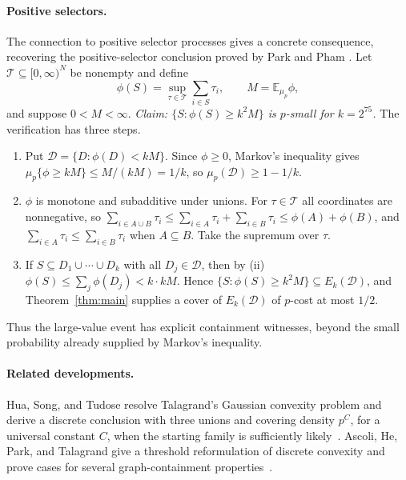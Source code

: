 \documentclass[11pt,letterpaper]{article}
\theoremstyle{definition}
\theoremstyle{remark}
\numberwithin{equation}{section}
\begin{document}
\paragraph{Positive selectors.}
The connection to positive selector processes \cite[Section~7]{Talagrand10}
gives a concrete consequence, recovering the positive-selector conclusion
proved by Park and Pham \cite[Theorem~1.2]{ParkPham24}. Let
$\mathcal T\subseteq[0,\infty)^N$ be nonempty and define
\[
\phi(S)=\sup_{\tau\in\mathcal T}\sum_{i\in S}\tau_i,
\qquad M=\mathbb E_{\mu_p}\phi,
\]
and suppose $0<M<\infty$. \emph{Claim: $\{S:\phi(S)\ge k^2M\}$ is $p$-small
for $k=2^{75}$.} The verification has three steps.
\begin{enumerate}[label=(\roman*)]
\item Put $\mathcal D=\{D:\phi(D)<kM\}$. Since $\phi\ge0$, Markov's inequality
gives $\mu_p\{\phi\ge kM\}\le M/(kM)=1/k$, so $\mu_p(\mathcal D)\ge1-1/k$.
\item $\phi$ is monotone and subadditive under unions. For $\tau\in\mathcal T$
all coordinates are nonnegative, so
$\sum_{i\in A\cup B}\tau_i\le\sum_{i\in A}\tau_i+\sum_{i\in B}\tau_i
\le\phi(A)+\phi(B)$, and $\sum_{i\in A}\tau_i\le\sum_{i\in B}\tau_i$ when
$A\subseteq B$. Take the supremum over $\tau$.
\item If $S\subseteq D_1\cup\cdots\cup D_k$ with all $D_j\in\mathcal D$, then by
(ii) $\phi(S)\le\sum_j\phi(D_j)<k\cdot kM$. Hence
$\{S:\phi(S)\ge k^2M\}\subseteq E_k(\mathcal D)$, and
Theorem~\ref{thm:main} supplies a cover of $E_k(\mathcal D)$ of $p$-cost at
most $1/2$.
\end{enumerate}
Thus the large-value event has explicit containment witnesses, beyond the
small probability already supplied by Markov's inequality.

\paragraph{Related developments.}
Hua, Song, and Tudose resolve Talagrand's Gaussian convexity problem and
derive a discrete conclusion with three unions and covering density
$p^C$, for a universal constant $C$, when the starting family is
sufficiently likely~\cite[Corollaries~1.3--1.4]{HuaSongTudose26}.
Ascoli, He, Park, and Talagrand give a threshold reformulation of discrete
convexity and prove cases for several graph-containment
properties~\cite[Proposition~1.5 and Theorems~1.10--1.13]{AscoliEtAl26}.
\end{document}
